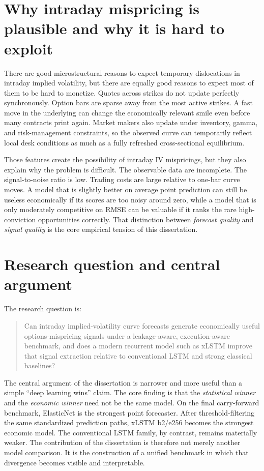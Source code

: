 \documentclass[12pt]{report}
\begin{document}
\section{Why intraday mispricing is plausible and why it is hard to exploit}
There are good microstructural reasons to expect temporary dislocations in intraday implied volatility, but there are equally good reasons to expect most of them to be hard to monetize. Quotes across strikes do not update perfectly synchronously. Option bars are sparse away from the most active strikes. A fast move in the underlying can change the economically relevant smile even before many contracts print again. Market makers also update under inventory, gamma, and risk-management constraints, so the observed curve can temporarily reflect local desk conditions as much as a fully refreshed cross-sectional equilibrium.

Those features create the possibility of intraday IV mispricings, but they also explain why the problem is difficult. The observable data are incomplete. The signal-to-noise ratio is low. Trading costs are large relative to one-bar curve moves. A model that is slightly better on average point prediction can still be useless economically if its scores are too noisy around zero, while a model that is only moderately competitive on RMSE can be valuable if it ranks the rare high-conviction opportunities correctly. That distinction between \emph{forecast quality} and \emph{signal quality} is the core empirical tension of this dissertation.

\section{Research question and central argument}
The research question is:

\begin{quote}
Can intraday implied-volatility curve forecasts generate economically useful options-mispricing signals under a leakage-aware, execution-aware benchmark, and does a modern recurrent model such as xLSTM improve that signal extraction relative to conventional LSTM and strong classical baselines?
\end{quote}

The central argument of the dissertation is narrower and more useful than a simple ``deep learning wins'' claim. The core finding is that the \emph{statistical winner} and the \emph{economic winner} need not be the same model. On the final carry-forward benchmark, ElasticNet is the strongest point forecaster. After threshold-filtering the same standardized prediction paths, xLSTM b2/e256 becomes the strongest economic model. The conventional LSTM family, by contrast, remains materially weaker. The contribution of the dissertation is therefore not merely another model comparison. It is the construction of a unified benchmark in which that divergence becomes visible and interpretable.
\end{document}
